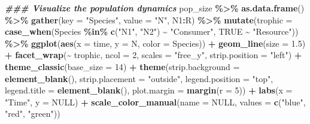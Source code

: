\documentclass[
]{book}
\newenvironment{Shaded}{\begin{snugshade}}{\end{snugshade}}
\newcommand{\AttributeTok}[1]{\textcolor[rgb]{0.13,0.29,0.53}{#1}}
\newcommand{\ConstantTok}[1]{\textcolor[rgb]{0.56,0.35,0.01}{#1}}
\newcommand{\DecValTok}[1]{\textcolor[rgb]{0.00,0.00,0.81}{#1}}
\newcommand{\DocumentationTok}[1]{\textcolor[rgb]{0.56,0.35,0.01}{\textbf{\textit{#1}}}}
\newcommand{\FloatTok}[1]{\textcolor[rgb]{0.00,0.00,0.81}{#1}}
\newcommand{\FunctionTok}[1]{\textcolor[rgb]{0.13,0.29,0.53}{\textbf{#1}}}
\newcommand{\NormalTok}[1]{#1}
\newcommand{\SpecialCharTok}[1]{\textcolor[rgb]{0.81,0.36,0.00}{\textbf{#1}}}
\newcommand{\StringTok}[1]{\textcolor[rgb]{0.31,0.60,0.02}{#1}}
\begin{document}
\begin{Shaded}
\begin{Highlighting}[]
\DocumentationTok{\#\#\# Visualize the population dynamics}
\NormalTok{pop\_size }\SpecialCharTok{\%\textgreater{}\%}
  \FunctionTok{as.data.frame}\NormalTok{() }\SpecialCharTok{\%\textgreater{}\%}
  \FunctionTok{gather}\NormalTok{(}\AttributeTok{key =} \StringTok{"Species"}\NormalTok{, }\AttributeTok{value =} \StringTok{"N"}\NormalTok{, N1}\SpecialCharTok{:}\NormalTok{R)  }\SpecialCharTok{\%\textgreater{}\%}
  \FunctionTok{mutate}\NormalTok{(}\AttributeTok{trophic =} \FunctionTok{case\_when}\NormalTok{(Species }\SpecialCharTok{\%in\%} \FunctionTok{c}\NormalTok{(}\StringTok{"N1"}\NormalTok{, }\StringTok{"N2"}\NormalTok{) }\SpecialCharTok{\textasciitilde{}} \StringTok{"Consumer"}\NormalTok{,}
                             \ConstantTok{TRUE} \SpecialCharTok{\textasciitilde{}} \StringTok{"Resource"}\NormalTok{)) }\SpecialCharTok{\%\textgreater{}\%}
  \FunctionTok{ggplot}\NormalTok{(}\FunctionTok{aes}\NormalTok{(}\AttributeTok{x =}\NormalTok{ time, }\AttributeTok{y =}\NormalTok{ N, }\AttributeTok{color =}\NormalTok{ Species)) }\SpecialCharTok{+} 
  \FunctionTok{geom\_line}\NormalTok{(}\AttributeTok{size =} \FloatTok{1.5}\NormalTok{) }\SpecialCharTok{+}
  \FunctionTok{facet\_wrap}\NormalTok{(}\SpecialCharTok{\textasciitilde{}}\NormalTok{ trophic, }
             \AttributeTok{ncol =} \DecValTok{2}\NormalTok{, }
             \AttributeTok{scales =} \StringTok{"free\_y"}\NormalTok{,}
             \AttributeTok{strip.position =} \StringTok{"left"}\NormalTok{) }\SpecialCharTok{+}
  \FunctionTok{theme\_classic}\NormalTok{(}\AttributeTok{base\_size =} \DecValTok{14}\NormalTok{) }\SpecialCharTok{+}
  \FunctionTok{theme}\NormalTok{(}\AttributeTok{strip.background =} \FunctionTok{element\_blank}\NormalTok{(),}
        \AttributeTok{strip.placement =} \StringTok{"outside"}\NormalTok{,}
        \AttributeTok{legend.position =} \StringTok{"top"}\NormalTok{,}
        \AttributeTok{legend.title =} \FunctionTok{element\_blank}\NormalTok{(),}
        \AttributeTok{plot.margin =} \FunctionTok{margin}\NormalTok{(}\AttributeTok{r =} \DecValTok{5}\NormalTok{)) }\SpecialCharTok{+} 
  \FunctionTok{labs}\NormalTok{(}\AttributeTok{x =} \StringTok{"Time"}\NormalTok{, }\AttributeTok{y =} \ConstantTok{NULL}\NormalTok{) }\SpecialCharTok{+} 
  \FunctionTok{scale\_color\_manual}\NormalTok{(}\AttributeTok{name =} \ConstantTok{NULL}\NormalTok{, }\AttributeTok{values =} \FunctionTok{c}\NormalTok{(}\StringTok{"blue"}\NormalTok{, }\StringTok{"red"}\NormalTok{, }\StringTok{"green"}\NormalTok{))}
\end{Highlighting}
\end{Shaded}
\end{document}
